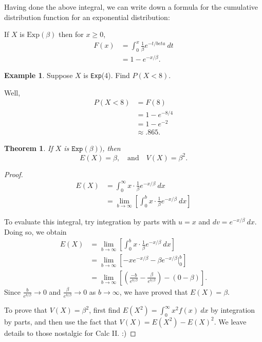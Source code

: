 \documentclass[
]{book}
\newtheorem{theorem}{Theorem}[chapter]
\theoremstyle{definition}
\theoremstyle{definition}
\newtheorem{example}{Example}[chapter]
\theoremstyle{definition}
\theoremstyle{definition}
\theoremstyle{remark}
\begin{document}
Having done the above integral, we can write down a formula for the cumulative distribution function for an exponential distribution:

If \(X\) is \(\text{Exp}(\beta)\) then for \(x \geq 0\),
\begin{align*}
F(x) &= \int_0^x \frac{1}{\beta}e^{-t/beta}~dt\\
    &= 1 - e^{-x/\beta}.
\end{align*}

\begin{example}
Suppose \(X\) is \texttt{Exp}(4). Find \(P(X < 8)\).

Well,
\begin{align*}
P(X < 8) &= F(8)\\
        &= 1 - e^{-8/4} \\
        &= 1 - e^{-2} \\
        &\approx .865.
\end{align*}
\end{example}

\begin{theorem}
\protect\hypertarget{thm:exponential-EandV}{}\label{thm:exponential-EandV}If \(X\) is \(\texttt{Exp}(\beta))\), then \[E(X) = \beta, ~~~ \text{ and } ~~~ V(X) = \beta^2.\]
\end{theorem}

\begin{proof}
\begin{align*}
E(X)&= \int_0^\infty x\cdot\frac{1}{\beta} e^{-x/\beta}~dx \\
    &= \lim_{b \to \infty}\left[\int_0^b x\cdot\frac{1}{\beta} e^{-x/\beta}~dx\right]
\end{align*}

To evaluate this integral, try integration by parts with \(u = x\) and \(dv = e^{-x/\beta}~dx\). Doing so, we obtain
\begin{align*}
E(X) &= \lim_{b \to \infty}\left[\int_0^b x\cdot\frac{1}{\beta} e^{-x/\beta}~dx\right]\\
    &= \lim_{b \to \infty}\left[-xe^{-x/\beta} - \beta e^{-x/\beta}\biggr|_0^b\right]\\
    &= \lim_{b \to \infty}\left[\left(\frac{-b}{e^{b/\beta}} - \frac{\beta}{e^{b/\beta}}\right) - \left(0 - \beta\right)\right].
\end{align*}
Since \(\displaystyle \frac{b}{e^{b/\beta}} \to 0\) and \(\displaystyle \frac{\beta}{e^{b/\beta}} \to 0\) as \(b \to \infty\), we have proved that \(E(X) = \beta.\)

To prove that \(V(X) = \beta^2\), first find \(E(X^2)=\int_0^\infty x^2 f(x)~dx\) by integration by parts, and then use the fact that \(V(X) = E(X^2)-E(X)^2\). We leave details to those nostalgic for Calc II. :)
\end{proof}
\end{document}
